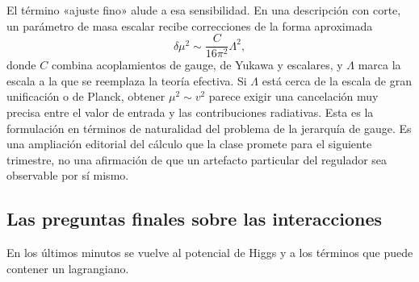 El término «ajuste fino» alude a esa sensibilidad. En una descripción con corte, un parámetro de masa escalar recibe correcciones de la forma aproximada
\begin{equation}
  \delta\mu^2
  \sim
  \frac{C}{16\pi^2}\Lambda^2,
  \label{eq:l10-higgs-quadratic-sensitivity}
\end{equation}
donde \(C\) combina acoplamientos de gauge, de Yukawa y escalares, y \(\Lambda\) marca la escala a la que se reemplaza la teoría efectiva. Si \(\Lambda\) está cerca de la escala de gran unificación o de Planck, obtener \(\mu^2\sim v^2\) parece exigir una cancelación muy precisa entre el valor de entrada y las contribuciones radiativas. Esta es la formulación en términos de naturalidad del problema de la jerarquía de gauge. Es una ampliación editorial del cálculo que la clase promete para el siguiente trimestre, no una afirmación de que un artefacto particular del regulador sea observable por sí mismo.

\begin{classroomqa}
\end{classroomqa}

\subsection{Las preguntas finales sobre las interacciones}

En los últimos minutos se vuelve al potencial de Higgs y a los términos que puede contener un lagrangiano.

\begin{classroomqa}
\end{classroomqa}

